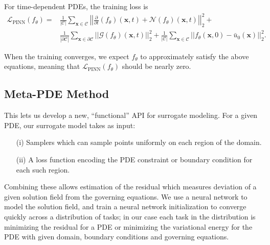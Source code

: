 For time-dependent PDEs, the training loss is
\begin{align}\label{eq:pinn_training_loss}
    \mathcal{L}_{\text{PINN}}(f_\theta) = & \frac{1}{|\mathcal{C}|} \sum_{\bm{x} \in \mathcal{C}}\left|\left| \frac{\partial}{\partial t}(f_\theta)(\bm{x}, t) + \mathcal{N} (f_{\theta})(\bm{x}, t) \right|\right|_2^2  +\\ 
     & \frac{1}{|\partial \mathcal{C}|}  \sum_{{\bm{x} \in \mathcal{\partial \mathcal{C}}} } \left|\left|\mathcal{G}(f_{\theta})(\bm{x}, t)\right|\right|_2^2 + \frac{1}{|\mathcal{C}|} \sum_{\bm{x} \in \mathcal{C}} \left|\left| f_{\theta}(\bm{x}, 0) - \bar{u}_0(\bm{x}) \right|\right| _2^2.
\end{align}

When the training converges, we expect $f_{\theta}$ to approximately satisfy the above equations, meaning that $\mathcal{L}_{\text{PINN}}(f_\theta)$ should be nearly zero.

\subsection{Meta-PDE Method}

This lets us develop a new, ``functional'' API for surrogate modeling.
For a given PDE, our surrogate model takes as input: 
\begin{itemize}
    \item[(i)] Samplers which can sample points uniformly on each region of the domain.
    \item[(ii)] A loss function encoding the PDE constraint or boundary condition for each such region.
\end{itemize}
Combining these allows estimation of the residual which measures deviation of a given solution field from the governing equations. We use a neural network to model the solution field, and train a neural network initialization to converge quickly across a distribution of tasks; in our case each task in the distribution is minimizing the residual for a PDE or minimizing the variational energy for the PDE with given domain, boundary conditions and governing equations. 

